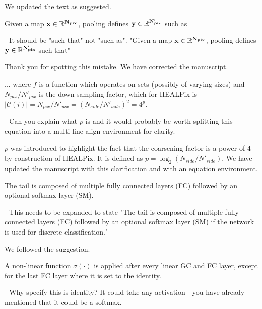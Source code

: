 \documentclass[12pt,a4paper]{article}
\newcommand{\nati}[1]{{\color[rgb]{.1,.6,.1}{NP: #1}}}
\newcommand{\todo}[1]{{\color[rgb]{.6,.1,.6}{TODO: #1}}}
\newcommand{\1}{\b{1}}              %
\newcommand{\0}{\b{0}}              %
\begin{document}
We updated the text as suggested.

\begin{mdframed}[style=comment]
Given a map $\bf{x}\in\mathbb{R}^{N_{pix}}$, pooling defines $\bf{y}\in\mathbb{R}^{N'_{pix}}$ such as

- It should be "such that" not "such as". "Given a map $\bf{x}\in\mathbb{R}^{N_{pix}}$, pooling defines $\bf{y}\in\mathbb{R}^{N'_{pix}}$ such that"
\end{mdframed}

Thank you for spotting this mistake. We have corrected the manuscript.

\begin{mdframed}[style=comment]
... where $f$ is a function which operates on sets (possibly of varying sizes) and $N_{pix}/N'_{pix}$ is the down-sampling factor, which for HEALPix is $|\mathcal{C}(i)| = N_{pix}/N'_{pix} = (N_{side} / N'_{side})^2 = 4^p$.

- Can you explain what $p$ is and it would probably be worth splitting this equation into a multi-line align environment for clarity.
\end{mdframed}

$p$ was introduced to highlight the fact that the coarsening factor is a power of 4 by construction of HEALPix.
It is defined as $p=\log_2(N_{side} / N'_{side})$.
We have updated the manuscript with this clarification and with an equation environment.

\begin{mdframed}[style=comment]
The tail is composed of multiple fully connected layers (FC) followed by an optional softmax layer (SM).

- This needs to be expanded to state "The tail is composed of multiple fully connected layers (FC) followed by an optional softmax layer (SM) if the network is used for discrete classification."
\end{mdframed}

We followed the suggestion.

\begin{mdframed}[style=comment]
A non-linear function $\sigma(\cdot)$ is applied after every linear GC and FC layer, except for the last FC layer where it is set to the identity.

- Why specify this is identity? It could take any activation - you have already mentioned that it could be a softmax.
\end{mdframed}
\end{document}
